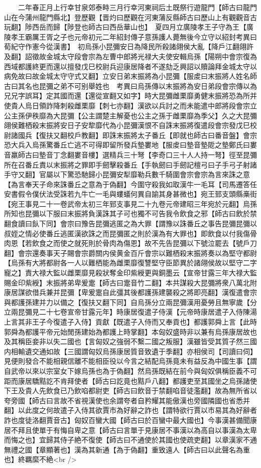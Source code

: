 　　二年春正月上行幸甘泉郊泰畤三月行幸河東祠后土既祭行遊龍門【師古曰龍門山在今蒲州龍門縣北】登歷觀【晋灼曰歷觀在河東蒲反縣師古曰歷山上有觀觀音古玩翻】陟西岳而歸【陟登也師古曰西岳華山也】　夏四月立廣陵孝王子守為王【廣陵孝王霸厲王胥之子也元帝初元二年紹封傳子意孫護人薨無後今立守以紹封考異曰荀紀守作憲今從漢書】　初烏孫小昆彌安日為降民所殺諸翖侯大亂【降戶江翻翖許及翻】詔徵故金城太守段會宗為左曹中郎將光禄大夫使安輯烏孫【陽朔中會宗復為西域都護終更而還以擅發戊巳校尉兵迎康居降者不遂劾乏興詔以贖論拜金城太守以病免故曰故金城太守守式又翻】立安日弟末振將為小昆彌【服䖍曰末振將人姓名師古曰其名也昆彌之弟不可别舉姓也　考異曰烏孫傳以末振將為安日弟段會宗傳以為兄兄字誤耳】定其國而還【還從宣翻又如字】時大昆彌雌栗靡勇健末振將恐為所并使貴人烏日領詐降刺殺雌栗靡【刺七亦翻】漢欲以兵討之而未能遣中郎將段會宗立公主孫伊秩靡為大昆彌【公主謂楚主解憂也公主之孫于雌栗靡為季父】久之大昆彌翖侯難栖殺末振將安日子安犂靡代為小昆彌漢恨不自誅末振將復遣段會宗發戊巳校尉諸國兵【復扶又翻校戶教翻】即誅末振將太子番丘【即就也師古曰番音盤】會宗恐大兵入烏孫驚番丘亡逃不可得即留所發兵墊婁地【服䖍曰墊音墊阸之墊鄭氏曰婁音羸師古曰墊音丁念翻婁音樓】選精兵三十弩【李奇口三十人人持一弩】徑至昆彌所在召番丘責以末振將之罪即手劒擊殺番丘【手執劒曰手劒記檀弓曰子手弓子射諸手守又翻】官屬以下驚恐馳歸小昆彌安犁靡勒兵數千騎圍會宗會宗為言來誅之意【為言奉天子命來誅番丘之意為于偽翻】今圍守殺我如取漢牛一毛耳【司馬遷答任安書假令僕伏法受誅若九牛亡一毛與螻蟻何異自諭其身甚微也】宛王郅支頭縣槀街【宛王事見二十一卷武帝太初三年郅支事見二十九卷元帝建昭三年宛於元翻】烏孫所知也昆彌以下服曰末振將負漢誅其子可也獨不可告我令飲食之邪【師古曰飲於禁翻食讀曰飤下同】會宗曰豫告昆彌逃匿之為大罪【謂豫以誅番丘之事告昆彌昆彌以叔姪之情必使番丘逃匿漢欲誅之而昆彌匿之則於漢為有大罪也】即飲食以付我傷骨肉恩【若飲食之而使之就死則於骨肉為傷恩】故不先告昆彌以下號泣罷去【號戶刀翻】會宗還奏事天子賜會宗爵關内侯黄金百斤會宗以難栖殺末振將奏以為堅守都尉【烏孫有大將都尉各一人以難栖能為雌栗靡復讐堅守臣節異於諸翖侯故以堅守二字寵之】責大禄大監以雌栗靡見殺狀奪金印紫綬更與銅墨云【宣帝甘露三年大禄大監賜金印紫綬】末振將弟卑爰疐【師古曰疐音竹二翻】本共謀殺大昆彌將衆八萬北附康居謀欲借兵兼并昆彌【卑爰疐自此彊其後都護孫建襲殺之將即亮翻】漢復遣會宗與都護孫建并力以備之【復扶又翻下同】自烏孫分立兩昆彌漢用憂勞且無寧歲【分立兩昆彌見二十七卷宣帝甘露元年】時康居復遣子侍漢【元帝時康居遣子入侍陳湯上言其非王子今復遣子入侍】貢獻【既遣子入侍而又奉貢也】都護郭舜上言【此時郭舜為都護平帝元始閒孫建始為都護上時掌翻】本匈奴盛時非以兼有烏孫康居故也及其稱臣妾非以失二國也【言匈奴之強弱不繫二國之叛服】漢雖皆受其質子然三國内相輸遺交通如故【三國謂匈奴烏孫康居質音致遺于季翻】亦相侯司【司讀曰伺】見便則發合不能相親信離不能相臣役以今言之結配烏孫竟未有益反為中國生事【謂自武帝以來以宗室女下嫁烏孫也為于偽翻】然烏孫既結在前今與匈奴俱稱臣義不可距而康居驕黠訖不肯拜使者【師古曰訖竟也黠戶八翻】都護吏至其國坐之烏孫諸使下王及貴人先飲食已乃飲啗都尉吏【師古曰飲音于禁翻啗音徒濫翻】故為無所省以夸旁國【師古曰言故不省視漢使也余謂夸者自矜耀其能傲漢也旁國隣國也省悉并翻】以此度之何故遣子入侍其欲賈市為好辭之詐也【謂特欲行賈以市易其為好辭者詐也度徒洛翻賈音古】匈奴百蠻大國【師古曰於百蠻中最大國也】今事漢甚備聞康居不拜且使單于有悔自卑之意【師古曰言單于見康居不事漢以為高自以事漢為太卑而悔之也】宜歸其侍子絶不復使【師古曰不通使於其國也使疏吏翻】以章漢家不通無禮之國【章顯著也】漢為其新通【為于偽翻】重致遠人【師古曰以此聲名為重也】終羈縻不絶<br />
